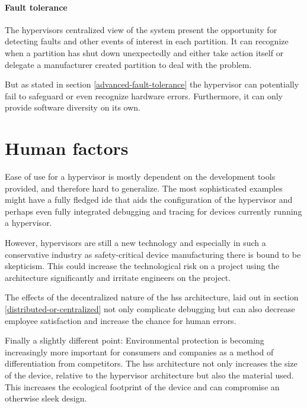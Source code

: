\paragraph{Fault tolerance}
The hypervisors centralized view of the system present the opportunity for detecting faults and other events of interest in each partition. It can recognize when a partition has shut down unexpectedly and either take action itself or delegate a manufacturer created partition to deal with the problem.

But as stated in section \ref{advanced-fault-tolerance} the hypervisor can potentially fail to safeguard or even recognize hardware errors. Furthermore, it can only provide software diversity on its own.


\section{Human factors}
Ease of use for a hypervisor is mostly dependent on the development tools provided, and therefore hard to generalize. The most sophisticated examples might have a fully fledged \acrshort{ide} that aids the configuration of the hypervisor and perhaps even fully integrated debugging and tracing for devices currently running a hypervisor. %

However, hypervisors are still a new technology and especially in such a conservative industry as safety-critical device manufacturing there is bound to be skepticism. This could increase the technological risk on a project using the architecture significantly and irritate engineers on the project.

The effects of the decentralized nature of the \acrshort{hss} architecture, laid out in section \ref{distributed-or-centralized} not only complicate debugging but can also decrease employee satisfaction and increase the chance for human errors.

Finally a slightly different point: Environmental protection is becoming increasingly more important for consumers and companies as a method of differentiation from competitors. The \acrshort{hss} architecture not only increases the size of the device, relative to the hypervisor architecture but also the material used. This increases the ecological footprint of the device and can compromise an otherwise sleek design.


